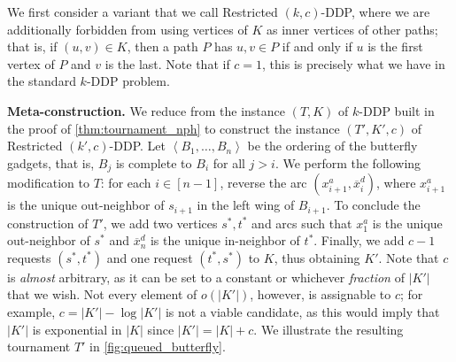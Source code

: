 \documentclass[a4paper,UKenglish,cleveref, autoref, thm-restate]{lipics-v2021}
\newcommand{\angled}[1]{\left\langle{#1}\right\rangle}
\newcommand{\pname}[1]{{\sc #1}}
\newcommand{\ol}[1]{\overline{#1}}
\newcommand{\congestion}{c}
\begin{document}
  We first consider a variant that we call \pname{Restricted $(k,c)$-DDP}, where we are additionally forbidden from using vertices of $K$ as inner
  vertices of other paths; that is, if $(u,v) \in K$, then a path $P$ has $u,v \in P$ if and
  only if $u$ is the first vertex of $P$ and $v$ is the last. Note that if $\congestion = 1$,
  this is precisely what we have in the standard \pname{$k$-DDP} problem.

  \noindent\textbf{Meta-construction.} We reduce from the instance $(T, K)$ of \pname{$k$-DDP} built in the proof of \autoref{thm:tournament_nph} to construct the
  instance $(T', K', \congestion)$ of \pname{Restricted $(k',c)$-DDP}. Let
  $\angled{B_1, \dots, B_n}$ be the ordering of the butterfly gadgets, that is, $B_j$ is
  complete to $B_i$ for all $j > i$.
  We perform the following modification to $T$: for each $i \in [n-1]$, reverse the arc
  $(x^a_{i+1}, \ol{x}^d_i)$, where $x^a_{i+1}$ is the unique out-neighbor of $s_{i+1}$ in
  the left wing of $B_{i+1}$.
  To conclude the construction of $T'$, we add two vertices $s^*, t^*$ and arcs such that
  $x^a_1$ is the unique out-neighbor of $s^*$ and $\ol{x}^d_n$ is the unique in-neighbor of $t^*$.
  Finally, we add $\congestion-1$ requests $(s^*, t^*)$ and one request $(t^*, s^*)$ to
  $K$, thus obtaining $K'$.
  Note that $\congestion$ is \textit{almost} arbitrary, as it can be set to a constant or whichever
  \textit{fraction} of $|K'|$ that we wish.
  Not every element of $o(|K'|)$, however, is assignable to $\congestion$; for example,
  $\congestion = |K'| -
  \log |K'|$ is not a viable candidate, as this would imply that $|K'|$ is exponential in
  $|K|$ since $|K'| = |K| + \congestion$.
  We illustrate the resulting tournament $T'$ in \autoref{fig:queued_butterfly}.
\end{document}
